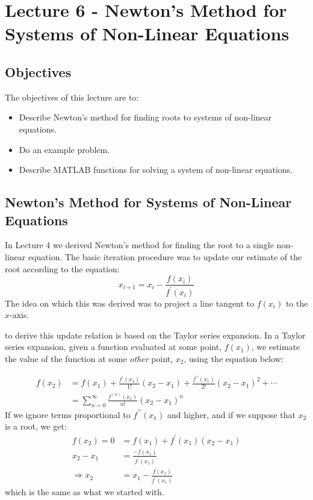 \chapter{Lecture 6 - Newton's Method for Systems of Non-Linear Equations}
\label{ch:lec6n}
\section{Objectives}
The objectives of this lecture are to:
\begin{itemize}
\item Describe Newton's method for finding roots to systems of non-linear equations.
\item Do an example problem.
\item Describe MATLAB functions for solving a system of non-linear equations.
\end{itemize}
\setcounter{lstannotation}{0}

\section{Newton's Method for Systems of Non-Linear Equations}

In Lecture 4 we derived Newton's method for finding the root to a single non-linear equation.  The basic iteration procedure was to update our estimate of the root according to the equation:
\begin{equation*}
x_{i+1} = x_i - \frac{f(x_i)}{f^{\prime}(x_i)}
\end{equation*}
The idea on which this was derived was to project a line tangent to $f(x_i)$ to the $x$-axis. 

 to derive this update relation is based on the Taylor series expansion.  In a Taylor series expansion, given a function evaluated at some point, $f(x_1)$, we estimate the value of the function at some \emph{other} point, $x_2$, using the equation below:

\begin{align*}
f(x_2) &= f(x_1) +  \frac{f^{\prime}(x_1)}{1!}(x_2 - x_1) +  \frac{f^{\prime \prime}(x_1)}{2!}(x_2 - x_1)^2 + \cdots \\
&= \sum\limits_{n=0}^{\infty} \frac{f^{(n)}(x_1)}{n!}(x_2 - x_1)^n
\end{align*}
If we ignore terms proportional to $f^{\prime \prime}(x_1)$ and higher, and if we suppose that $x_2$ is a root, we get:
\begin{align*}
f(x_2) = 0 &= f(x_1) + f^{\prime}(x_1)(x_2 - x_1) \\
x_2 - x_1 &= \frac{-f(x_1)}{f^{\prime}(x_1)} \\
\Rightarrow x_2 &= x_1 - \frac{f(x_1)}{f^{\prime}(x_1)} 
\end{align*}
which is the same as what we started with.

